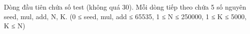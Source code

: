 Dòng đầu tiên chứa số test (không quá 30). Mỗi dòng tiếp theo chứa 5 số nguyên seed, mul, add, N, K. (0 ≤ seed, mul, add ≤ 65535, 1 ≤ N ≤ 250000, 1 ≤ K ≤ 5000, K ≤ N)  

\